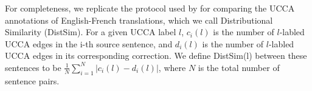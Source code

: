 \documentclass[letter,11pt]{article}
\begin{document}
For completeness, we  replicate the protocol used by 
for comparing the UCCA annotations of English-French translations, which we call
Distributional Similarity ({\sc DistSim}).
For a given UCCA label $l$, $c_i(l)$ is the number of $l$-labled UCCA edges
in the i-th source sentence, and $d_i(l)$ is the number of $l$-labled UCCA edges
in its corresponding correction. We define {\sc DistSim}(l) between these
sentences to be $\frac{1}{N}\sum_{i=1}^N \vert c_i(l) - d_i(l) \vert$, where
$N$ is the total number of sentence pairs.
%
%
%
%
\end{document}
